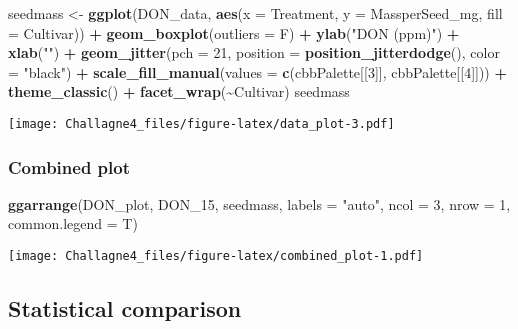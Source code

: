 \documentclass[
]{article}
\newenvironment{Shaded}{\begin{snugshade}}{\end{snugshade}}
\newcommand{\AttributeTok}[1]{\textcolor[rgb]{0.13,0.29,0.53}{#1}}
\newcommand{\DecValTok}[1]{\textcolor[rgb]{0.00,0.00,0.81}{#1}}
\newcommand{\FunctionTok}[1]{\textcolor[rgb]{0.13,0.29,0.53}{\textbf{#1}}}
\newcommand{\NormalTok}[1]{#1}
\newcommand{\OtherTok}[1]{\textcolor[rgb]{0.56,0.35,0.01}{#1}}
\newcommand{\SpecialCharTok}[1]{\textcolor[rgb]{0.81,0.36,0.00}{\textbf{#1}}}
\newcommand{\StringTok}[1]{\textcolor[rgb]{0.31,0.60,0.02}{#1}}
\begin{document}
\begin{Shaded}
\begin{Highlighting}[]
\NormalTok{seedmass }\OtherTok{\textless{}{-}} \FunctionTok{ggplot}\NormalTok{(DON\_data, }\FunctionTok{aes}\NormalTok{(}\AttributeTok{x =}\NormalTok{ Treatment, }\AttributeTok{y =}\NormalTok{ MassperSeed\_mg, }\AttributeTok{fill =}\NormalTok{ Cultivar)) }\SpecialCharTok{+}
  \FunctionTok{geom\_boxplot}\NormalTok{(}\AttributeTok{outliers =}\NormalTok{ F) }\SpecialCharTok{+}
  \FunctionTok{ylab}\NormalTok{(}\StringTok{"DON (ppm)"}\NormalTok{) }\SpecialCharTok{+}
  \FunctionTok{xlab}\NormalTok{(}\StringTok{""}\NormalTok{) }\SpecialCharTok{+}
  \FunctionTok{geom\_jitter}\NormalTok{(}\AttributeTok{pch =} \DecValTok{21}\NormalTok{, }\AttributeTok{position =} \FunctionTok{position\_jitterdodge}\NormalTok{(), }\AttributeTok{color =} \StringTok{"black"}\NormalTok{) }\SpecialCharTok{+} 
  \FunctionTok{scale\_fill\_manual}\NormalTok{(}\AttributeTok{values =} \FunctionTok{c}\NormalTok{(cbbPalette[[}\DecValTok{3}\NormalTok{]], cbbPalette[[}\DecValTok{4}\NormalTok{]])) }\SpecialCharTok{+}
  \FunctionTok{theme\_classic}\NormalTok{() }\SpecialCharTok{+}
  \FunctionTok{facet\_wrap}\NormalTok{(}\SpecialCharTok{\textasciitilde{}}\NormalTok{Cultivar)}
\NormalTok{seedmass}
\end{Highlighting}
\end{Shaded}

\texttt{[image: Challagne4\_files/figure-latex/data\_plot-3.pdf]}

\subsubsection{\texorpdfstring{\textbf{Combined
plot}}{Combined plot}}\label{combined-plot}

\begin{Shaded}
\begin{Highlighting}[]
\FunctionTok{ggarrange}\NormalTok{(DON\_plot, DON\_15, seedmass, }\AttributeTok{labels =} \StringTok{"auto"}\NormalTok{, }\AttributeTok{ncol =} \DecValTok{3}\NormalTok{, }\AttributeTok{nrow =} \DecValTok{1}\NormalTok{, }\AttributeTok{common.legend =}\NormalTok{ T)}
\end{Highlighting}
\end{Shaded}

\texttt{[image: Challagne4\_files/figure-latex/combined\_plot-1.pdf]}

\subsection{\texorpdfstring{\textbf{Statistical
comparison}}{Statistical comparison}}\label{statistical-comparison}
\end{document}
